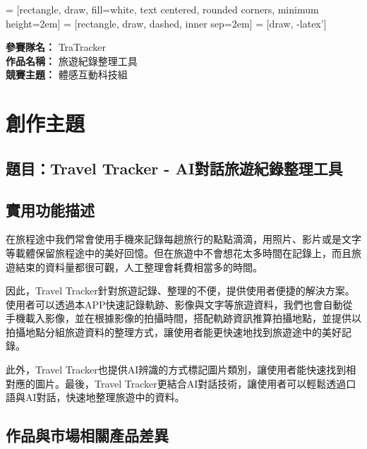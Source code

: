 \documentclass[12pt]{article}
\begin{document}
\date{}
\usetikzlibrary{automata, positioning, arrows, shapes, fit}
{}
 = [rectangle, draw, fill=white, 
    text centered, rounded corners, minimum height=2em]
 = [rectangle, draw, dashed, inner sep=2em]
 = [draw, -latex']
\setlength{\parindent}{2em}

\noindent
\textbf{參賽隊名：} TraTracker \\
\textbf{作品名稱：} 旅遊紀錄整理工具 \\
\textbf{競賽主題：} 體感互動科技組

\section{創作主題}

\subsection{題目：Travel Tracker - AI對話旅遊紀錄整理工具}

\subsection{實用功能描述}

在旅程途中我們常會使用手機來記錄每趟旅行的點點滴滴，用照片、影片或是文字等載體保留旅程途中的美好回憶。但在旅遊中不會想花太多時間在記錄上，而且旅遊結束的資料量都很可觀，人工整理會耗費相當多的時間。

因此，Travel Tracker針對旅遊記錄、整理的不便，提供使用者便捷的解決方案。使用者可以透過本APP快速記錄軌跡、影像與文字等旅遊資料，我們也會自動從手機載入影像，並在根據影像的拍攝時間，搭配軌跡資訊推算拍攝地點，並提供以拍攝地點分組旅遊資料的整理方式，讓使用者能更快速地找到旅遊途中的美好記錄。

此外，Travel Tracker也提供AI辨識的方式標記圖片類別，讓使用者能快速找到相對應的圖片。最後，Travel Tracker更結合AI對話技術，讓使用者可以輕鬆透過口語與AI對話，快速地整理旅遊中的資料。

\subsection{作品與市場相關產品差異}
\end{document}

